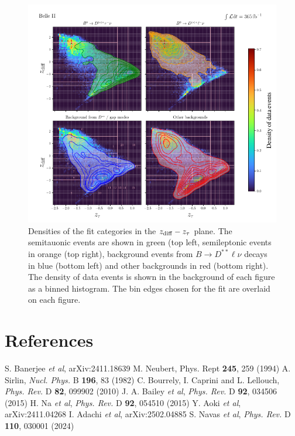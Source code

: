 \documentclass{moriond}
\def\Journal#1#2#3#4{{#1} {\bf #2}, #3 (#4)}
\def\NPB{{\em Nucl. Phys.} B}
\def\PLB{{\em Phys. Lett.}  B}
\def\PRD{{\em Phys. Rev.} D}
\def\zdiff{z_{\rm diff}}
\begin{document}
\begin{figure}[h!]
    \centering
    \includegraphics[scale=0.7]{2d_rd.pdf}
    \caption{Densities of the fit categories in the $\zdiff-z_\tau$ plane. The semitauonic events are shown in green (top left, semileptonic events in orange (top right), background events from $B \to D^{**}\ell\nu$ decays in blue (bottom left) and other backgrounds in red (bottom right). The density of data events is shown in the background of each figure as a binned histogram. The bin edges chosen for the fit are overlaid on each figure.}
    \label{fig:2d_rd}
\end{figure}





\section*{References}

\begin{thebibliography}{99}

S. Banerjee {\it et al}, arXiv:2411.18639
M. Neubert, \Journal{Phys. Rept}{245}{259}{1994}
A. Sirlin, \Journal{\NPB}{196}{83}{1982}
C. Bourrely, I. Caprini and L. Lellouch, \Journal{\PRD}{82}{099902}{2010}
J. A. Bailey {\it et al}, \Journal{\PRD}{92}{034506}{2015}
H. Na {\it et al}, \Journal{\PRD}{92}{054510}{2015}
Y. Aoki {\it et al}, arXiv:2411.04268
I. Adachi {\it et al}, arXiv:2502.04885
S. Navas {\it et al}, \Journal{\PRD}{110}{030001}{2024}


\end{thebibliography}
\end{document}
